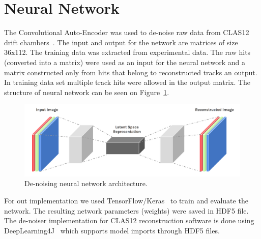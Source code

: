 \section{Neural Network}

The Convolutional Auto-Encoder was used to de-noise raw data from CLAS12 drift chambers~\cite{Thomadakis:2022zcd}. The input and output for the network are matrices of size 36x112. The training data was extracted from experimental data. The raw hits (converted into a matrix) were used as an input for the neural network and a matrix constructed only from hits that belong to reconstructed tracks an output. In training data set multiple track hits were allowed in the output matrix. The structure of neural network can be seen on Figure~\ref{network:cnn_encoder}.

\begin{figure}[!h]
\begin{center}
 \includegraphics[width=5.1in]{images/convolutional-autoencoder.png}
\caption {De-noising neural network architecture.}
 \label{network:cnn_encoder}
 \end{center}
\end{figure}

For out implementation we used TensorFlow/Keras~\cite{keras-website} to train and evaluate the network. The resulting network parameters (weights) were saved in HDF5 file. The de-noiser implementation for CLAS12 reconstruction software is done using DeepLearning4J~\cite{dl4j-website} which supports model imports through HDF5 files. 
